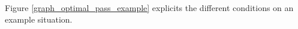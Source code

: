 Figure \ref{graph_optimal_pass_example} explicits the different conditions on an example situation.




